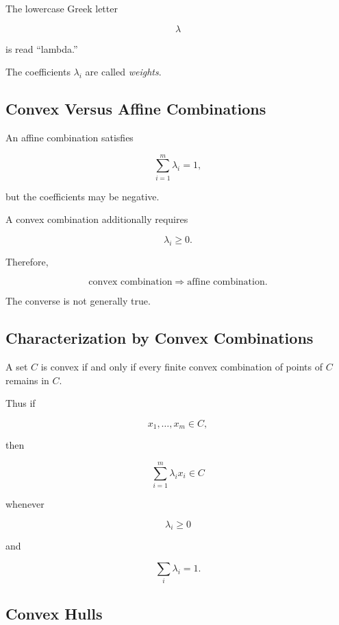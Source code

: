 The lowercase Greek letter

\[
\lambda
\]

is read ``lambda.''

The coefficients \(\lambda_i\) are called \emph{weights}.

\subsection{Convex Versus Affine Combinations}
\label{subsec:convex-vs-affine-combinations}

An affine combination satisfies

\[
\sum_{i=1}^{m}\lambda_i=1,
\]

but the coefficients may be negative.

A convex combination additionally requires

\[
\boxed{
\lambda_i\geq0.
}
\]

Therefore,

\[
\boxed{
\text{convex combination}
\Longrightarrow
\text{affine combination}.
}
\]

The converse is not generally true.

\subsection{Characterization by Convex Combinations}
\label{subsec:convex-combination-characterization}

A set \(C\) is convex if and only if every finite convex combination of
points of \(C\) remains in \(C\).

Thus if

\[
x_1,\ldots,x_m\in C,
\]

then

\[
\boxed{
\sum_{i=1}^{m}\lambda_ix_i\in C
}
\]

whenever

\[
\lambda_i\geq0
\]

and

\[
\sum_i\lambda_i=1.
\]

\subsection{Convex Hulls}
\label{subsec:convex-hulls}

